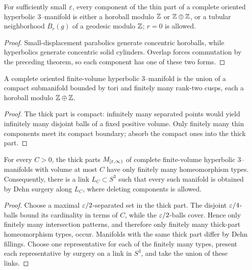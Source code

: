\begin{corollary}
\label{thurston-ch05-thin-part-components}
For sufficiently small $\varepsilon$, every component of the thin part of a complete oriented hyperbolic $3$--manifold is either a horoball modulo $\mathbb{Z}$ or $\mathbb{Z}\oplus\mathbb{Z}$, or a tubular neighborhood $B_r(g)$ of a geodesic modulo $\mathbb{Z}$; $r=0$ is allowed.
\end{corollary}
\begin{proof}\sketch Small-displacement parabolics generate concentric horoballs, while hyperbolics generate concentric solid cylinders.  Overlap forces commutation by the preceding theorem, so each component has one of these two forms.\end{proof}

\begin{proposition}
\label{thurston-ch05-finite-volume-cusp-decomposition}
A complete oriented finite-volume hyperbolic $3$--manifold is the union of a compact submanifold bounded by tori and finitely many rank-two cusps, each a horoball modulo $\mathbb{Z}\oplus\mathbb{Z}$.
\end{proposition}
\begin{proof}\sketch The thick part is compact: infinitely many separated points would yield infinitely many disjoint balls of a fixed positive volume.  Only finitely many thin components meet its compact boundary; absorb the compact ones into the thick part.\end{proof}

\begin{theorem}
\label{thurston-ch05-jorgensen-compactness}
For every $C>0$, the thick parts $M_{[\varepsilon,\infty)}$ of complete finite-volume hyperbolic $3$--manifolds with volume at most $C$ have only finitely many homeomorphism types.  Consequently, there is a link $L_C\subset S^3$ such that every such manifold is obtained by Dehn surgery along $L_C$, where deleting components is allowed.
\end{theorem}
\begin{proof}\sketch Choose a maximal $\varepsilon/2$-separated set in the thick part.  The disjoint $\varepsilon/4$-balls bound its cardinality in terms of $C$, while the $\varepsilon/2$-balls cover.  Hence only finitely many intersection patterns, and therefore only finitely many thick-part homeomorphism types, occur.  Manifolds with the same thick part differ by Dehn fillings.  Choose one representative for each of the finitely many types, present each representative by surgery on a link in $S^3$, and take the union of these links.\end{proof}

